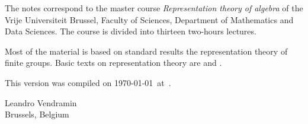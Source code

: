 \preface

The notes correspond to the master  
course \emph{Representation theory of algebra} of the 
Vrije Universiteit Brussel, 
Faculty of Sciences, 
Department of Mathematics and Data Sciences. The course
is divided into thirteen two-hours lectures. 

Most of the material is based on standard 
results the representation theory of finite groups. 
Basic texts on representation theory are \cite{MR1369573} 
and \cite{MR2270898}. 


This version 
was compiled on \today~at~\currenttime.

\bigskip
\begin{flushright}
Leandro Vendramin\\Brussels, Belgium\par
\end{flushright}
